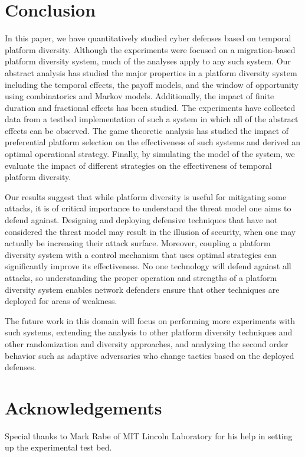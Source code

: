 \documentclass{acm_proc_article-sp}
\begin{document}
\section{Conclusion}
\label{Conc}
In this paper, we have quantitatively studied cyber defenses based on temporal platform diversity. Although the experiments were focused on a migration-based platform diversity system, much of the analyses apply to any such system. Our abstract analysis has studied the major properties in a platform diversity system including the temporal effects, the payoff models, and the window of opportunity using combinatorics and Markov models. Additionally, the impact of finite duration and fractional effects has been studied. The experiments have collected data from a testbed implementation of such a system in which all of the abstract effects can be observed. The game theoretic analysis has studied the impact of preferential platform selection on the effectiveness of such systems and derived an optimal operational strategy. Finally, by simulating the model of the system, we evaluate the impact of different strategies on the effectiveness of temporal platform diversity.

Our results suggest that while platform diversity is useful for mitigating some attacks, it is of critical importance to understand the threat model one aims to defend against. Designing and deploying defensive techniques that have not considered the threat model may result in the illusion of security, when one may actually be increasing their attack surface. Moreover, coupling a platform diversity system with a control mechanism that uses optimal strategies can significantly improve its effectiveness. No one technology will defend against all attacks, so understanding the proper operation and strengths of a platform diversity system enables network defenders ensure that other techniques are deployed for areas of weakness.

The future work in this domain will focus on performing more experiments with such systems, extending the analysis to other platform diversity techniques and other randomization and diversity approaches, and analyzing the second order behavior such as adaptive adversaries who change tactics based on the deployed defenses.

\section{Acknowledgements}
Special thanks to Mark Rabe of MIT Lincoln Laboratory for his help in setting up the experimental test bed.
\end{document}
